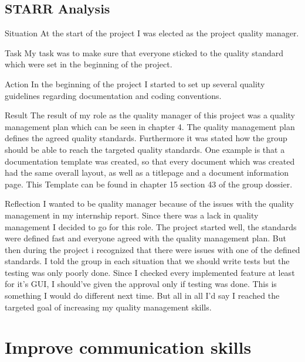 \documentclass[12pt]{article}
\begin{document}
	\subsection{STARR Analysis}
	\begin{STARR}
	    \item[Situation] At the start of the project I was elected as the project quality manager.
	    \item[Task] My task was to make sure that everyone sticked to the quality standard which were set in the beginning of the project.
	    \item[Action] In the beginning of the project I started to set up several quality guidelines regarding documentation and coding conventions.
	    \item[Result] The result of my role as the quality manager of this project was a quality management plan which can be seen in chapter 4. The quality management plan defines the agreed quality standards. Furthermore it was stated how the group should be able to reach the targeted quality standards. One example is that a documentation template was created, so that every document which was created had the same overall layout, as well as a titlepage and a document information page. This Template can be found in chapter 15 section 43 of the group dossier.
	    \item[Reflection] I wanted to be quality manager because of the issues with the quality management in my internship report. Since there was a lack in quality management I decided to go for this role. The project started well, the standards were defined fast and everyone agreed with the quality management plan. But then during the project i recognized that there were issues with one of the defined standards. I told the group in each situation that we should write tests but the testing was only poorly done. Since I checked every implemented feature at least for it's GUI, I should've given the approval only if testing was done. This is something I would do different next time. But all in all I'd say I reached the targeted goal of increasing my quality management skills.
	\end{STARR}
	
	\section{Improve communication skills}
\end{document}
